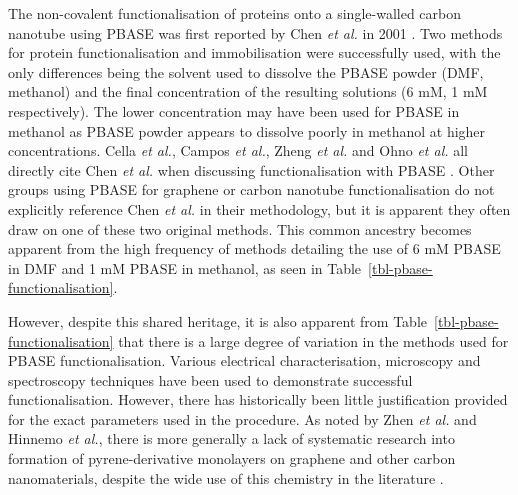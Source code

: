 \documentclass[
  a4paper,
]{scrbook}
\begin{document}
The non-covalent functionalisation of proteins onto a single-walled
carbon nanotube using PBASE was first reported by Chen \emph{et al.} in
2001 \autocite{Chen2001}. Two methods for protein functionalisation and
immobilisation were successfully used, with the only differences being
the solvent used to dissolve the PBASE powder (DMF, methanol) and the
final concentration of the resulting solutions (6 mM, 1 mM
respectively). The lower concentration may have been used for PBASE in
methanol as PBASE powder appears to dissolve poorly in methanol at
higher concentrations. Cella \emph{et al.}, Campos \emph{et al.}, Zheng
\emph{et al.} and Ohno \emph{et al.} all directly cite Chen \emph{et
al.} when discussing functionalisation with PBASE
\autocite{Cella2010,Campos2019,Zheng2016,Ohno2010}. Other groups using
PBASE for graphene or carbon nanotube functionalisation do not
explicitly reference Chen \emph{et al.} in their methodology, but it is
apparent they often draw on one of these two original methods. This
common ancestry becomes apparent from the high frequency of methods
detailing the use of 6 mM PBASE in DMF and 1 mM PBASE in methanol, as
seen in Table~\ref{tbl-pbase-functionalisation}.

However, despite this shared heritage, it is also apparent from
Table~\ref{tbl-pbase-functionalisation} that there is a large degree of
variation in the methods used for PBASE functionalisation. Various
electrical characterisation, microscopy and spectroscopy techniques have
been used to demonstrate successful functionalisation. However, there
has historically been little justification provided for the exact
parameters used in the procedure. As noted by Zhen \emph{et al.} and
Hinnemo \emph{et al.}, there is more generally a lack of systematic
research into formation of pyrene-derivative monolayers on graphene and
other carbon nanomaterials, despite the wide use of this chemistry in
the literature \autocite{Zhen2018,Hinnemo2017}.
\end{document}
